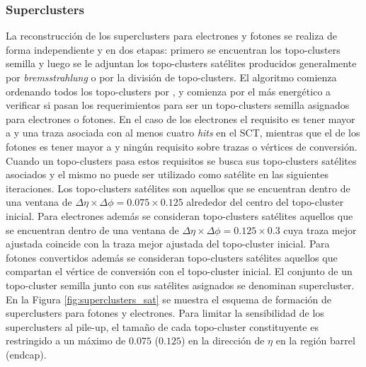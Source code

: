 \subsubsection{Superclusters}

La reconstrucción de los superclusters para electrones y fotones se realiza de forma independiente y en dos etapas: primero se encuentran los topo-clusters semilla 
y luego se le adjuntan los topo-clusters satélites producidos generalmente por \textit{bremsstrahlung} o por la división de topo-clusters. El algoritmo comienza ordenando todos los topo-clusters por \ET, y comienza por el más energético a verificar si pasan los requerimientos para ser un topo-clusters semilla asignados para electrones o fotones. En el caso de los electrones el requisito es tener \ET mayor a  y una traza asociada con al menos cuatro \textit{hits} en el SCT, mientras que el de los fotones es tener \ET mayor a  y ningún requisito sobre trazas o vértices de conversión. Cuando un topo-clusters pasa estos requisitos se busca sus topo-clusters satélites asociados y el mismo no puede ser utilizado como satélite en las siguientes iteraciones. Los topo-clusters satélites son aquellos que se encuentran dentro de una ventana de $\Delta\eta\times\Delta\phi=0.075\times0.125$ alrededor del centro del topo-cluster inicial. Para electrones además se consideran topo-clusters satélites aquellos que se encuentran dentro de una ventana de $\Delta\eta\times\Delta\phi=0.125\times0.3$ cuya traza mejor ajustada coincide con la traza mejor ajustada del topo-cluster inicial. Para fotones convertidos además se consideran topo-clusters satélites aquellos que compartan el vértice de conversión con el topo-cluster inicial. El conjunto de un topo-cluster semilla junto con sus satélites asignados se denominan supercluster. En la Figura \ref{fig:superclusters_sat} se muestra el esquema de formación de superclusters para fotones y electrones. Para limitar la sensibilidad de los superclusters al pile-up, el tamaño de cada topo-cluster constituyente es restringido a un máximo de $0.075$ ($0.125$) en la dirección de $\eta$  en la región barrel (endcap). 

